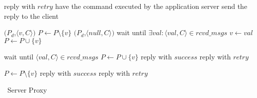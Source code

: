 \begin{algorithm}[h!]
\small

\begin{distribalgo}[1]

\vspace{1.25mm}


\vspace{1.0mm}


    \vspace{1.0mm}

                \STATE reply with $retry$
            \ELSE
                \STATE have the command executed by the application server
                \STATE send the reply to the client
            \ENDIF
        

        \vspace{1.0mm}
    
                    \STATE \rmcast$(P_d$,$\langle v, C \rangle)$
                    \STATE $P \leftarrow P \setminus \{v\}$
                \ELSE
                    \STATE \rmcast$(P_d$,$\langle null, C \rangle)$
                \ENDIF
            \ELSE
                \STATE wait until $\exists val : \langle val, C \rangle \in rcvd\_msgs$
                    \STATE $v \leftarrow val$
                    \STATE $P \leftarrow P \cup \{v\}$
                \ENDIF
            \ENDIF
        
        \vspace{1.0mm}
    
            \STATE wait until $\langle val, C \rangle \in rcvd\_msgs$
                \STATE $P \leftarrow P \cup \{v\}$
                \STATE reply with $success$
            \ELSE
                \STATE reply with $retry$
            \ENDIF
        
        \vspace{1.0mm}
        
                \STATE $P \leftarrow P \setminus \{v\}$
                \STATE reply with $success$
            \ELSE
                \STATE reply with $retry$
            \ENDIF
        \ENDIF
    \ENDINDENT
\ENDINDENT

\caption{\dssmr\ Server Proxy}
\label{alg:server_proxy}
\end{distribalgo}
\end{algorithm}